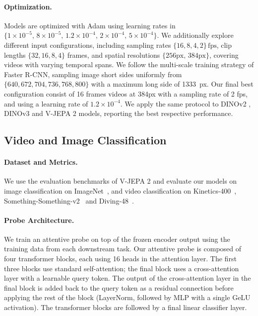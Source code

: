 \documentclass[]{fairmeta}
\begin{document}
\paragraph{\bf Optimization.} Models are optimized with Adam using learning rates in  $\{1\!\times\!10^{-5},\, 8\!\times\!10^{-5},\, 1.2\!\times\!10^{-4},\, 2\!\times\!10^{-4},\, 5\!\times\!10^{-4}\}$.  We additionally explore different input configurations, including sampling rates  $\{16, 8, 4, 2\}\,\text{fps}$, clip lengths $\{32, 16, 8, 4\}$ frames, and spatial resolutions $\{256\text{px},\, 384\text{px}\}$, covering videos with varying temporal spans. We follow the multi-scale training strategy of Faster R-CNN, sampling image short sides uniformly from $\{640,672,704,736,768,800\}$ with a maximum long side of 1333~px. Our final best configuration consist of 16 frames videos at 384px with a sampling rate of 2 fps, and using a learning rate of $1.2\!\times\!10^{-4}$. We apply the same protocol to DINOv2 \cite{oquab2023dinov2}, DINOv3 \cite{simeoni2025dinov3} and V-JEPA 2 \cite{assran2025v} models, reporting the best respective performance.

\subsection{Video and Image Classification} \label{app:classification}

\paragraph{\bf Dataset and Metrics.} We use the evaluation benchmarks of V-JEPA 2 and evaluate our models on image classification on ImageNet~\cite{deng2009imagenet}, and video classification on Kinetics-400~\cite{kay2017kinetics}, Something-Something-v2~\cite{goyal2017something} and Diving-48~\cite{li2018resound}.

\paragraph{\bf Probe Architecture.} We train an attentive probe on top of the frozen encoder output using the training data from each downstream task. Our attentive probe is composed of four transformer blocks, each using 16 heads in the attention layer. The first three blocks use standard self-attention; the final block uses a cross-attention layer with a learnable query token. The output of the cross-attention layer in the final block is added back to the query token as a residual connection before applying the rest of the block (LayerNorm, followed by MLP with a single GeLU activation). The transformer blocks are followed by a final linear classifier layer.
\end{document}
